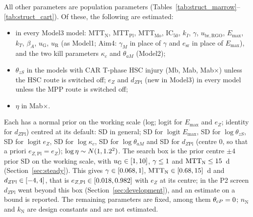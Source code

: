 \documentclass[11pt]{article}
\DeclareMathOperator{\logit}{logit}
\begin{document}
All other parameters are population parameters (Tables~\ref{tab:struct_marrow}--\ref{tab:struct_cart}). Of these, the following are estimated:
\begin{itemize}
\item in every Model3 model: $\mathrm{MTT}_{\mathrm{N}}$, $\mathrm{MTT}_{\mathrm{Pl}}$, $\mathrm{MTT}_{\mathrm{Mo}}$, $\mathrm{IC}_{50}$, $k_I$, $\gamma$, $u_{\mathrm{br,RGO}}$, $E_{\max}$, $k_T$, $\beta_A$, $u_{\mathrm{G}}$, $u_{\mathrm{R}}$ (as Model1; Aim4: $\gamma_M$ in place of $\gamma$ and $e_{\mathrm{sr}}$ in place of $E_{\max}$), and the two kill parameters $\kappa_c$ and $\theta_{aM}$ (Model2);
\item $\theta_{zS}$ in the models with CAR T-phase HSC injury (Mb, Mab, Mab$\times$) unless the HSC route is switched off; $e_Z$ and $d_{Z\mathrm{Pl}}$ (new in Model3) in every model unless the MPP route is switched off;
\item $\eta$ in Mab$\times$.
\end{itemize}
Each has a normal prior on the working scale (log; logit for $E_{\max}$ and $e_Z$; identity for $d_{Z\mathrm{Pl}}$) centred at its default: SD \valStructSd{} in general; SD \valEmaxSd{} for $\logit E_{\max}$, SD \valThzsSd{} for $\log\theta_{zS}$, SD \valEzSd{} for $\logit e_Z$, SD \valKappaCSd{} for $\log\kappa_c$, SD \valThAmSd{} for $\log\theta_{aM}$ and SD \valDzplSd{} for $d_{Z\mathrm{Pl}}$ (centre 0, so that a priori $e_{Z,\mathrm{Pl}}=e_Z$); $\log\eta\sim N(1,1.2^2)$. The search box is the prior centre $\pm4$ prior SD on the working scale, with $u_{\mathrm{G}}\in[1,10]$, $\gamma\leq1$ and $\mathrm{MTT}_{\mathrm{N}}\leq15$~d (Section~\ref{sec:steady}). This gives $\gamma\in[0.068,1]$, $\mathrm{MTT}_{\mathrm{N}}\in[0.68,15]$~d and $d_{Z\mathrm{Pl}}\in[-4,4]$, that is $e_{Z,\mathrm{Pl}}\in[0.018,0.982]$ with $e_Z$ at its centre; in the P2 screen $d_{Z\mathrm{Pl}}$ went beyond this box (Section~\ref{sec:development}), and an estimate on a bound is reported. The remaining parameters are fixed, among them $\theta_{cP}=0$; $n_{\mathrm{N}}$ and $k_{\mathrm{N}}$ are design constants and are not estimated.









\end{document}
